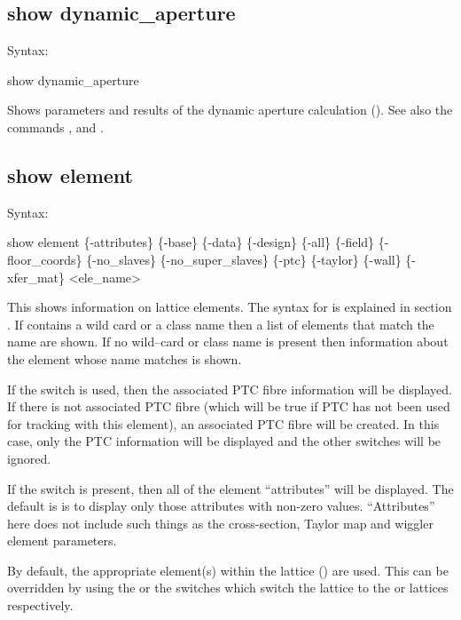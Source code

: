 {{{{{{{{{\subsection{show dynamic_aperture}
\label{s:show.da}

Syntax:
\begin{example}
  show dynamic_aperture
\end{example}

Shows parameters and results of the dynamic aperture calculation ().
See also the commands , and .


\subsection{show element}
\label{s:show.element}

Syntax:
\begin{example}
  show element \{-attributes\} \{-base\} \{-data\} \{-design\} \{-all\} \{-field\}
      \{-floor_coords\} \{-no_slaves\} \{-no_super_slaves\} \{-ptc\} \{-taylor\} \{-wall\} 
      \{-xfer_mat\} <ele_name>
\end{example}

This shows information on lattice elements. The syntax for  is explained in section
. If  contains a wild card or a class name then a list of
elements that match the name are shown. If no wild--card or class name is present then information
about the element whose name matches  is shown.

If the  switch is used, then the associated PTC fibre information will be displayed. If
there is not associated PTC fibre (which will be true if PTC has not been used for tracking with
this element), an associated PTC fibre will be created. In this case, only the PTC information will
be displayed and the other switches will be ignored.

If the  switch is present, then all of the element ``attributes'' will be
displayed. The default is is to display only those attributes with non-zero values. ``Attributes''
here does not include such things as the cross-section, Taylor map and wiggler element parameters.

By default, the appropriate element(s) within the  lattice () are
used. This can be overridden by using the  or the  switches which switch the
lattice to the  or  lattices respectively.

}}}}}}}}}
